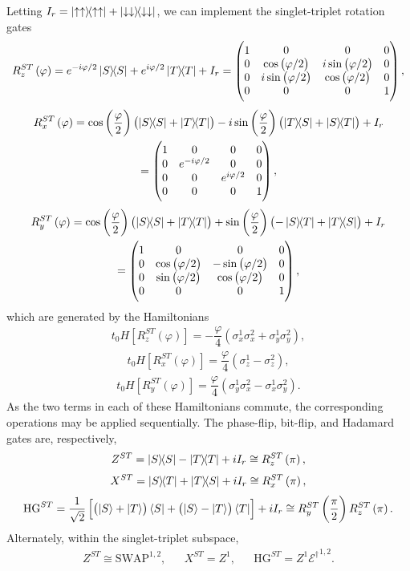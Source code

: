 \documentclass[11pt]{article}
\renewcommand{\t}{\text} %
\newcommand{\f}[2]{\dfrac{#1}{#2}} %
\newcommand{\p}[1]{\left(#1\right)} %
\renewcommand{\sp}[1]{\left[#1\right]} %
\renewcommand{\d}{\partial} %
\renewcommand{\phi}{\varphi} %
\newcommand{\m}[1]{\begin{pmatrix}#1\end{pmatrix}} %
\renewcommand{\u}{\uparrow}
\renewcommand{\d}{\downarrow}
\newcommand{\E}{\mathcal E}
\begin{document}
Letting $I_r=\op{\u\u}+\op{\d\d}$, we can implement the
singlet-triplet rotation gates
\begin{align}
  R_z^{ST}\p\phi=e^{-i\phi/2}\op S+e^{i\phi/2}\op T+I_r
  =\m{1 & 0 & 0 & 0 \\
    0 & \cos\p{\phi/2} & i \sin\p{\phi/2} & 0 \\
    0 & i \sin\p{\phi/2} & \cos\p{\phi/2} & 0 \\
    0 & 0 & 0 & 1},
\end{align}
\begin{multline}
  R_x^{ST}\p\phi=\cos\p{\f\phi2}\p{\op S+\op T}
  -i\sin\p{\f\phi2}\p{\op{T}{S}+\op{S}{T}}+I_r \\
  =\m{1 & 0 & 0 & 0 \\
    0 & e^{-i\phi/2} & 0 & 0 \\
    0 & 0 & e^{i\phi/2} & 0 \\
    0 & 0 & 0 & 1},
\end{multline}
\begin{multline}
  R_y^{ST}\p\phi=\cos\p{\f\phi2}\p{\op S+\op T}
  +\sin\p{\f\phi2}\p{-\op{S}{T}+\op{T}{S}}+I_r \\
  =\m{1 & 0 & 0 & 0 \\
    0 & \cos\p{\phi/2} & -\sin\p{\phi/2} & 0 \\
    0 & \sin\p{\phi/2} & \cos\p{\phi/2} & 0 \\
    0 & 0 & 0 & 1},
\end{multline}
which are generated by the Hamiltonians
\begin{align}
  t_0H\sp{R_z^{ST}\p\phi}=-\f\phi4\p{\sigma_x^1\sigma_x^2
    +\sigma_y^1\sigma_y^2},
\end{align}
\begin{align}
  t_0H\sp{R_x^{ST}\p\phi}=\f\phi4\p{\sigma_z^1-\sigma_z^2},
\end{align}
\begin{align}
  t_0H\sp{R_y^{ST}\p\phi}=\f\phi4\p{\sigma_y^1\sigma_x^2
    -\sigma_x^1\sigma_y^2}.
\end{align}
As the two terms in each of these Hamiltonians commute, the
corresponding operations may be applied sequentially.  The phase-flip,
bit-flip, and Hadamard gates are, respectively,
\begin{align}
  Z^{ST}=\op S-\op T+iI_r\cong R_z^{ST}\p\pi,
\end{align}
\begin{align}
  X^{ST}=\op{S}{T}+\op{T}{S}+iI_r\cong R_x^{ST}\p\pi,
\end{align}
\begin{align}
  \t{HG}^{ST}=\f1{\sqrt2}\sp{\p{\ket S+\ket T}\bra S +\p{\ket S-\ket
      T}\bra T}+iI_r\cong R_y^{ST}\p{\f\pi2}R_z^{ST}\p\pi.
\end{align}
Alternately, within the singlet-triplet subspace,
\begin{align}
  Z^{ST}\cong\t{SWAP}^{1,2}, && X^{ST}=Z^1, &&
  \t{HG}^{ST}=Z^1{\E^\dag}^{1,2}.
\end{align}
\end{document}
